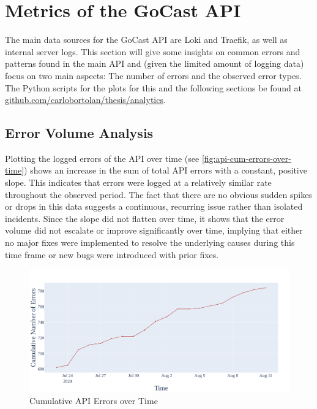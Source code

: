 \section{Metrics of the GoCast API}

The main data sources for the GoCast \ac{API} are Loki and Traefik, as well as internal server logs. This section will give some insights on common errors and patterns found in the main \ac{API} and (given the limited amount of logging data) focus on two main aspects: The number of errors and the observed error types. The Python scripts for the plots for this and the following sections be found at \href{https://github.com/carlobortolan/thesis/tree/analytics}{github.com/carlobortolan/thesis/analytics}.

\subsection{Error Volume Analysis}

Plotting the logged errors of the \ac{API} over time (see \autoref{fig:api-cum-errors-over-time}) shows an increase in the sum of total \ac{API} errors with a constant, positive slope. This indicates that errors were logged at a relatively similar rate throughout the observed period. The fact that there are no obvious sudden spikes or drops in this data suggests a continuous, recurring issue rather than isolated incidents. Since the slope did not flatten over time, it shows that the error volume did not escalate or improve significantly over time, implying that either no major fixes were implemented to resolve the underlying causes during this time frame or new bugs were introduced with prior fixes.

\begin{figure}[htpb]
    \centering
    \includegraphics[width=\linewidth]{images/plots/api/cum_errors_over_time.png}
    \caption[Cumulative \ac{API} Errors over Time]{Cumulative \ac{API} Errors over Time}\label{fig:api-cum-errors-over-time}
\end{figure}

